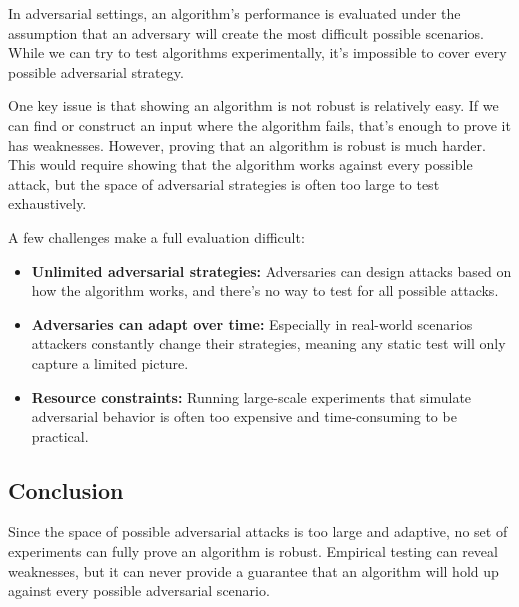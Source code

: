 In adversarial settings, an algorithm’s performance is evaluated under the assumption that an adversary will create the most difficult possible scenarios. While we can try to test algorithms experimentally, it’s impossible to cover every possible adversarial strategy.

One key issue is that showing an algorithm is not robust is relatively easy. If we can find or construct an input where the algorithm fails, that’s enough to prove it has weaknesses. However, proving that an algorithm is robust is much harder. This would require showing that the algorithm works against every possible attack, but the space of adversarial strategies is often too large to test exhaustively.

A few challenges make a full evaluation difficult:

\begin{itemize}
    \item \textbf{Unlimited adversarial strategies:} Adversaries can design attacks based on how the algorithm works, and there’s no way to test for all possible attacks.
    \item \textbf{Adversaries can adapt over time:} Especially in real-world scenarios attackers constantly change their strategies, meaning any static test will only capture a limited picture.
    \item \textbf{Resource constraints:} Running large-scale experiments that simulate adversarial behavior is often too expensive and time-consuming to be practical.
\end{itemize}
    
\subsection*{Conclusion}

Since the space of possible adversarial attacks is too large and adaptive, no set of experiments can fully prove an algorithm is robust. Empirical testing can reveal weaknesses, but it can never provide a guarantee that an algorithm will hold up against every possible adversarial scenario.
